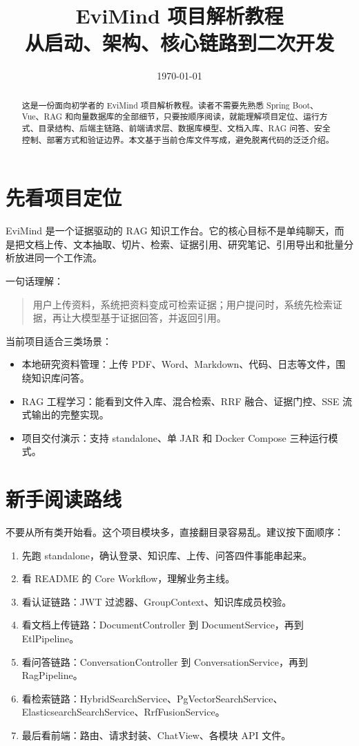 \documentclass[UTF8,zihao=-4]{ctexart}
\title{\textbf{EviMind 项目解析教程}\\
\large 从启动、架构、核心链路到二次开发}
\author{}
\date{\today}
\begin{document}
\maketitle

\begin{abstract}
这是一份面向初学者的 EviMind 项目解析教程。读者不需要先熟悉 Spring Boot、Vue、RAG 和向量数据库的全部细节，只要按顺序阅读，就能理解项目定位、运行方式、目录结构、后端主链路、前端请求层、数据库模型、文档入库、RAG 问答、安全控制、部署方式和验证边界。本文基于当前仓库文件写成，避免脱离代码的泛泛介绍。
\end{abstract}

\tableofcontents
\newpage

\section{先看项目定位}

EviMind 是一个证据驱动的 RAG 知识工作台。它的核心目标不是单纯聊天，而是把文档上传、文本抽取、切片、检索、证据引用、研究笔记、引用导出和批量分析放进同一个工作流。

一句话理解：

\begin{quote}
用户上传资料，系统把资料变成可检索证据；用户提问时，系统先检索证据，再让大模型基于证据回答，并返回引用。
\end{quote}

当前项目适合三类场景：

\begin{itemize}
  \item 本地研究资料管理：上传 PDF、Word、Markdown、代码、日志等文件，围绕知识库问答。
  \item RAG 工程学习：能看到文件入库、混合检索、RRF 融合、证据门控、SSE 流式输出的完整实现。
  \item 项目交付演示：支持 standalone、单 JAR 和 Docker Compose 三种运行模式。
\end{itemize}

\section{新手阅读路线}

不要从所有类开始看。这个项目模块多，直接翻目录容易乱。建议按下面顺序：

\begin{enumerate}
  \item 先跑 standalone，确认登录、知识库、上传、问答四件事能串起来。
  \item 看 README 的 Core Workflow，理解业务主线。
  \item 看认证链路：JWT 过滤器、GroupContext、知识库成员校验。
  \item 看文档上传链路：DocumentController 到 DocumentService，再到 EtlPipeline。
  \item 看问答链路：ConversationController 到 ConversationService，再到 RagPipeline。
  \item 看检索链路：HybridSearchService、PgVectorSearchService、ElasticsearchSearchService、RrfFusionService。
  \item 最后看前端：路由、请求封装、ChatView、各模块 API 文件。
\end{enumerate}
\end{document}
